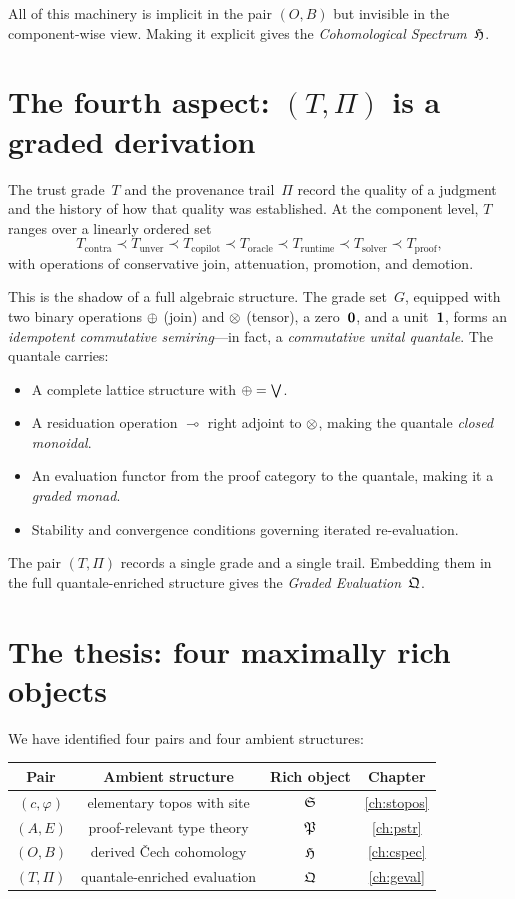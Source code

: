 All of this machinery is implicit in the pair $(O,B)$ but invisible in
the component-wise view.  Making it explicit gives the \emph{Cohomological
Spectrum}~$\mathfrak{H}$.

\section{The fourth aspect: $(T,\Pi)$ is a graded derivation}
\label{sec:obs-grade}

The trust grade~$T$ and the provenance trail~$\Pi$ record the quality
of a judgment and the history of how that quality was established.  At
the component level, $T$ ranges over a linearly ordered set
\[
  T_{\mathrm{contra}} \prec T_{\mathrm{unver}} \prec T_{\mathrm{copilot}}
  \prec T_{\mathrm{oracle}} \prec T_{\mathrm{runtime}} \prec
  T_{\mathrm{solver}} \prec T_{\mathrm{proof}},
\]
with operations of conservative join, attenuation, promotion, and
demotion.

This is the shadow of a full algebraic structure.  The grade set~$G$,
equipped with two binary operations $\oplus$ (join) and $\otimes$ (tensor),
a zero~$\mathbf{0}$, and a unit~$\mathbf{1}$, forms an \emph{idempotent
commutative semiring}---in fact, a \emph{commutative unital quantale}.
The quantale carries:
\begin{itemize}[nosep]
\item A complete lattice structure with $\oplus = \bigvee$.
\item A residuation operation $\multimap$ right adjoint to $\otimes$,
  making the quantale \emph{closed monoidal}.
\item An evaluation functor from the proof category to the quantale,
  making it a \emph{graded monad}.
\item Stability and convergence conditions governing iterated
  re-evaluation.
\end{itemize}
The pair $(T,\Pi)$ records a single grade and a single trail.
Embedding them in the full quantale-enriched structure gives the
\emph{Graded Evaluation}~$\mathfrak{Q}$.

\section{The thesis: four maximally rich objects}

We have identified four pairs and four ambient structures:
\begin{center}
\renewcommand{\arraystretch}{1.3}
\begin{tabular}{@{}cccc@{}}
\textbf{Pair} & \textbf{Ambient structure} & \textbf{Rich object} &
\textbf{Chapter} \\
\hline
$(c,\varphi)$ & elementary topos with site &
$\mathfrak{S}$ & \ref{ch:stopos} \\
$(A,E)$ & proof-relevant type theory &
$\mathfrak{P}$ & \ref{ch:pstr} \\
$(O,B)$ & derived \v{C}ech cohomology &
$\mathfrak{H}$ & \ref{ch:cspec} \\
$(T,\Pi)$ & quantale-enriched evaluation &
$\mathfrak{Q}$ & \ref{ch:geval}
\end{tabular}
\end{center}

